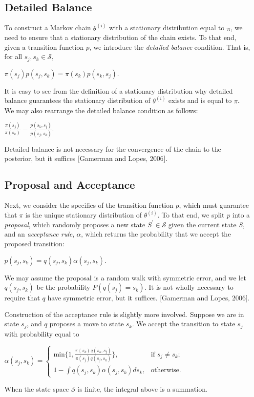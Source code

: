 \documentclass[12pt,twoside]{reedthesis}
\begin{document}
		\subsection*{Detailed Balance}
			To construct a Markov chain $\theta^{(i)}$ with a stationary distribution equal to $\pi$, 
			we need to ensure that a stationary distribution of the chain exists. 
			To that end, given a transition function $p$, we introduce the {\em detailed balance} condition. 
			That is, for all $s_j, s_k \in \mathcal S$,
			\begin{center}
				$ \pi(s_j) p(s_j,s_k) = \pi(s_k) p(s_k,s_j)$.
			\end{center}
			It is easy to see from the definition of a stationary distribution why detailed balance guarantees the stationary distribution of $\theta^{(i)}$ exists and is equal to $\pi$. 
			We may also rearrange the detailed balance condition as follows:
			\begin{center}
				$\displaystyle \frac{\pi(s_j)}{\pi(s_k)} = \frac{p(s_k, s_j)}{p(s_j, s_k)}$.
			\end{center}
			Detailed balance is not necessary for the convergence of the chain to the posterior, but it suffices [Gamerman and Lopes, 2006]. 
		\subsection*{Proposal and Acceptance}
			Next, we consider the specifics of the transition function $p$, which must guarantee that $\pi$ is the unique stationary distribution of $\theta^{(i)}$.
			To that end, we split $p$ into a {\em proposal}, which randomly proposes a new state $S^{'} \in\mathcal S$ given the current state $S$, and an {\em acceptance rule}, $\alpha$, which returns the probability that we accept the proposed transition:
			\begin{center}
				$p(s_j,s_k) = q(s_j,s_k) \alpha(s_j,s_k)$.
			\end{center}
			We may assume the proposal is a random walk with symmetric error, and we let $q(s_j,s_k)$ be the probability $P(q(s_j) = s_k)$.
			It is not wholly necessary to require that $q$ have symmetric error, but it suffices. [Gamerman and Lopes, 2006].
			
			Construction of the acceptance rule is slightly more involved. 
			Suppose we are in state $s_j$, and $q$ proposes a move to state $s_k$. 
			We accept the transition to state $s_j$ with probability equal to
			\begin{center}
			$ \alpha(s_j,s_k) = 
			\begin{cases} \textrm{min}\{1, \frac{\pi(s_k)q(s_k, s_j)}{\pi(s_j)q(s_j, s_k)}\}, & \textrm{if\ \ \ } s_j \neq s_k; \\
			1 - \int q(s_j,s_k)\alpha(s_j,s_k)ds_k, & \textrm{otherwise}. \end{cases}
			$
			\end{center}
			When the state space $\mathcal S$ is finite, the integral above is a summation.
			
\end{document}
